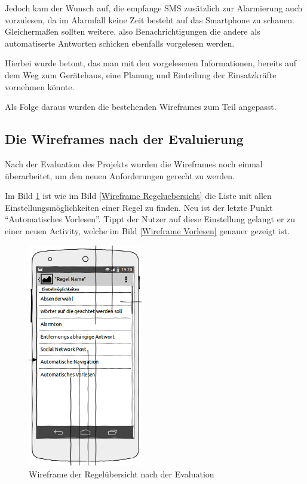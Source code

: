 Jedoch kam der Wunsch auf, die empfange SMS zus\"atzlich zur Alarmierung auch vorzulesen, da im Alarmfall keine Zeit besteht auf das Smartphone zu schauen. Gleicherma\ss{}en sollten weitere, also Benachrichtigungen die andere als automatiserte Antworten schicken ebenfalls vorgelesen werden.

Hierbei wurde betont, das man mit den vorgelesenen Informationen, bereits auf dem Weg zum Ger\"atehaus, eine Planung und Einteilung der Einsatzkr\"afte vornehmen k\"onnte.

Als Folge daraus wurden die bestehenden Wireframes zum Teil angepasst.

\subsection{Die Wireframes nach der Evaluierung}
Nach der Evaluation des Projekts wurden die Wireframes noch einmal \"uberarbeitet, um den neuen Anforderungen gerecht zu werden.

Im Bild \ref{Wireframe Regeluebersicht nach Eval} ist wie im Bild \ref{Wireframe Regeluebersicht} die Liste mit allen Einstellungsm\"oglichkeiten einer Regel zu finden. Neu ist der letzte Punkt "`Automatisches Vorlesen"'. Tippt der Nutzer auf diese Einstellung gelangt er zu einer neuen Activity, welche im Bild \ref{Wireframe Vorlesen} genauer gezeigt ist.
\begin{figure}[!ht]
\centering
\includegraphics[width=5cm]{Bilder/WireFrame_RegelauswahlNachEvaluation.png}
\caption{Wireframe der Regel\"ubersicht nach der Evaluation}
\label{Wireframe Regeluebersicht nach Eval}
\centering
\end{figure}

